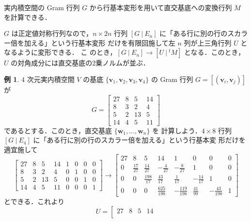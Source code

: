 \documentclass[11pt, uplatex, dvipdfmx]{jsarticle}
\theoremstyle{definition}
\newtheorem*{example}{例}
\begin{document}
\newpage


実内積空間の Gram 行列 $G$ から行基本変形を用いて直交基底への変換行列 $M$ を計算できる．

$G$ は正定値対称行列なので，$n \times 2n$ 行列 $\left[ G \ | \
  E_n\right]$ に「ある行に別の行のスカラー倍を加える」という行基本変形
だけを有限回施して左 $n$ 列が上三角行列 $U$ となるように変形できる． こ
のとき，$\left[ G \ | \ E_n\right] \to \left[ U \ | \ {}^{t}M \right]$
となる．このとき，$U$ の対角成分には直交基底の2乗ノルムが並ぶ．

\begin{example}
  $4$ 次元実内積空間 $V$ の基底 $\{\bm{v}_1, \bm{v}_2, \bm{v}_3,
  \bm{v}_4\}$ の Gram 行列 $G=\left[ (\bm{v}_i, \bm{v}_j)\right]$ が
  \[
    G =\left[
      \begin{array}{rrrr}
        27 & 8 & 5 & 14\\
        8 & 3 & 2 & 4\\
        5 & 2 & 13 & 5\\
        14 & 4 & 5 & 11
      \end{array}
    \right]
  \]
  であるとする．このとき，直交基底 $\{\bm{w}_1, \ldots, \bm{w}_n\}$ を
  計算しよう．$4 \times 8$ 行列 $\left[ G \ | \
    E_4\right]$ に「ある行に別の行のスカラー倍を加える」という行基本変
  形だけを適宜施して
  \[
    \left[
      \begin{array}{rrrr|rrrr}
        27 & 8 & 5 & 14 & 1 & 0 & 0 & 0\\
        8 & 3 & 2 & 4 & 0 & 1 & 0 & 0 \\
        5 & 2 & 13 & 5 & 0 & 0 & 1 & 0\\
        14 & 4 & 5 & 11 & 0 & 0 & 0 & 1
      \end{array}
    \right] \longrightarrow \left[
      \begin{array}{rrrr|rrrr}
        27 & 8 & 5 & 14 & 1 & 0 & 0 & 0\\
        0 & \frac{17}{27} & \frac{14}{27} & -\frac{4}{27} & -\frac{8}{27} & 1 & 0 & 0\\
        0 & 0 & \frac{198}{17} & \frac{43}{17} & \frac{1}{17} & -\frac{14}{17} & 1 & 0\\
        0 & 0 & 0 & \frac{625}{198} & -\frac{119}{198} & \frac{41}{99} & -\frac{43}{198} & 1
      \end{array}
    \right]
  \]
  とできる．これより
  \[
    U = \left[
      \begin{array}{rrrr}
         27 & 8 & 5 & 14 \\

\end{array}\]
\end{example}
\end{document}
